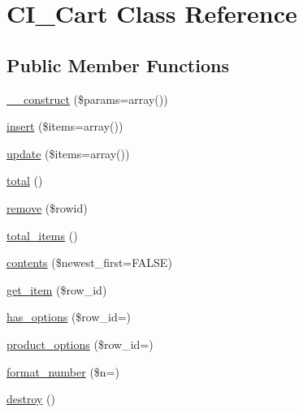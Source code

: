 \hypertarget{class_c_i___cart}{}\section{C\+I\+\_\+\+Cart Class Reference}
\label{class_c_i___cart}
\subsection*{Public Member Functions}
\begin{DoxyCompactItemize}
\item 
\mbox{\hyperlink{class_c_i___cart_a714238bb292818961e0055d626aeec6e}{\+\_\+\+\_\+construct}} (\$params=array())
\item 
\mbox{\hyperlink{class_c_i___cart_aa7dd4b1bdf5f75195d6c6d9525513057}{insert}} (\$items=array())
\item 
\mbox{\hyperlink{class_c_i___cart_a8839ef38bd59aa82545048a59b12dd51}{update}} (\$items=array())
\item 
\mbox{\hyperlink{class_c_i___cart_a56223f02085af765015279b8c644c20a}{total}} ()
\item 
\mbox{\hyperlink{class_c_i___cart_a6dff875ea45702dc16faaa6ce76d2dec}{remove}} (\$rowid)
\item 
\mbox{\hyperlink{class_c_i___cart_a580f84b961eed3024e6a9566e4a17874}{total\+\_\+items}} ()
\item 
\mbox{\hyperlink{class_c_i___cart_a7e15dcb9b66da6fbaf7298d47b2cd579}{contents}} (\$newest\+\_\+first=F\+A\+L\+SE)
\item 
\mbox{\hyperlink{class_c_i___cart_a26c1e78928a44090df549fdf86c82ec8}{get\+\_\+item}} (\$row\+\_\+id)
\item 
\mbox{\hyperlink{class_c_i___cart_a4b13905bb2ac799b2572eb06bd106e11}{has\+\_\+options}} (\$row\+\_\+id=\textquotesingle{}\textquotesingle{})
\item 
\mbox{\hyperlink{class_c_i___cart_ac15deabee56211701de5d6ae53ea4155}{product\+\_\+options}} (\$row\+\_\+id=\textquotesingle{}\textquotesingle{})
\item 
\mbox{\hyperlink{class_c_i___cart_a7a83e8d522696e8fd780a4b884f2c1ba}{format\+\_\+number}} (\$n=\textquotesingle{}\textquotesingle{})
\item 
\mbox{\hyperlink{class_c_i___cart_ae5c9fc32a2251e50bb6a3cb0529c411d}{destroy}} ()
\end{DoxyCompactItemize}
